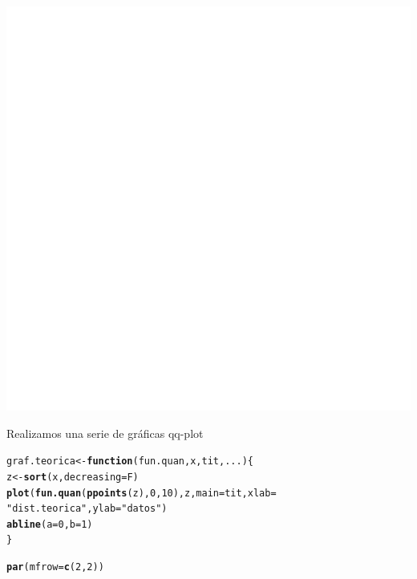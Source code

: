 \documentclass[12 pt]{article}\usepackage[]{graphicx}\usepackage[]{color}
\makeatletter
\def\maxwidth{ %
  \ifdim\Gin@nat@width>\linewidth
    \linewidth
  \else
    \Gin@nat@width
  \fi
}
\newcommand{\hlnum}[1]{\textcolor[rgb]{0.686,0.059,0.569}{#1}}%
\newcommand{\hlstr}[1]{\textcolor[rgb]{0.192,0.494,0.8}{#1}}%
\newcommand{\hlstd}[1]{\textcolor[rgb]{0.345,0.345,0.345}{#1}}%
\newcommand{\hlkwa}[1]{\textcolor[rgb]{0.161,0.373,0.58}{\textbf{#1}}}%
\newcommand{\hlkwb}[1]{\textcolor[rgb]{0.69,0.353,0.396}{#1}}%
\newcommand{\hlkwc}[1]{\textcolor[rgb]{0.333,0.667,0.333}{#1}}%
\newcommand{\hlkwd}[1]{\textcolor[rgb]{0.737,0.353,0.396}{\textbf{#1}}}%
\newenvironment{kframe}{%
 \def\at@end@of@kframe{}%
 \ifinner\ifhmode%
  \def\at@end@of@kframe{\end{minipage}}%
  \begin{minipage}{\columnwidth}%
 \fi\fi%
 \def\FrameCommand##1{\hskip\@totalleftmargin \hskip-\fboxsep
 \colorbox{shadecolor}{##1}\hskip-\fboxsep
     \hskip-\linewidth \hskip-\@totalleftmargin \hskip\columnwidth}%
 \MakeFramed {\advance\hsize-\width
   \@totalleftmargin\z@ \linewidth\hsize
   \@setminipage}}%
 {\par\unskip\endMakeFramed%
 \at@end@of@kframe}
\newenvironment{knitrout}{}{} %
\makeatother
\begin{document}
\begin{enumerate}
\begin{knitrout}
\begin{kframe}
{\ttfamily\noindent\bfseries\color{errorcolor}{\#\# Error in FUN(X[[i]], ...): Objekt 'val' nicht gefunden}}\end{kframe}
\includegraphics[width=\maxwidth]{figure/unnamed-chunk-11-1} 

\end{knitrout}

Realizamos una serie de gráficas qq-plot 

\begin{knitrout}
\color{fgcolor}\begin{kframe}
\begin{alltt}
\hlstd{graf.teorica} \hlkwb{<-} \hlkwa{function}\hlstd{(}\hlkwc{fun.quan}\hlstd{,}\hlkwc{x}\hlstd{,}\hlkwc{tit}\hlstd{,}\hlkwc{...}\hlstd{)\{}
    \hlstd{z} \hlkwb{<-} \hlkwd{sort}\hlstd{(x,}\hlkwc{decreasing}\hlstd{=F)}
    \hlkwd{plot}\hlstd{(}\hlkwd{fun.quan}\hlstd{(}\hlkwd{ppoints}\hlstd{(z),}\hlnum{0}\hlstd{,}\hlnum{10}\hlstd{),z,}\hlkwc{main}\hlstd{=tit,}\hlkwc{xlab} \hlstd{=}
    \hlstr{"dist. teorica"}\hlstd{,}\hlkwc{ylab} \hlstd{=} \hlstr{"datos"}\hlstd{)}
    \hlkwd{abline}\hlstd{(}\hlkwc{a}\hlstd{=}\hlnum{0}\hlstd{,}\hlkwc{b}\hlstd{=}\hlnum{1}\hlstd{)}
\hlstd{\}}

\hlkwd{par}\hlstd{(}\hlkwc{mfrow} \hlstd{=} \hlkwd{c}\hlstd{(}\hlnum{2}\hlstd{,}\hlnum{2}\hlstd{))}


\end{alltt}
\end{kframe}
\end{knitrout}
\end{enumerate}
\end{document}
